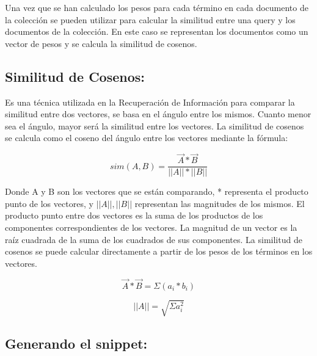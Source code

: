 \documentclass[a4paper,12pt]{article}
\begin{document}
Una vez que se han calculado los pesos para cada término en cada documento de la colección
se pueden utilizar para calcular la similitud entre una query y los documentos de la colección.
En este caso se representan los documentos como un vector de pesos y se calcula la similitud
de cosenos.

\subsection{Similitud de Cosenos:}
Es una técnica utilizada en la Recuperación de Información para comparar la similitud entre dos
vectores, se basa en el ángulo entre los mismos. Cuanto menor sea el ángulo, mayor será la
similitud entre los vectores. La similitud de cosenos se calcula como el coseno del ángulo entre
los vectores mediante la fórmula:
    \begin{center}
    \begin{equation}
        sim(A, B) = \frac{\overrightarrow{A} * \overrightarrow{B}}{||A|| * ||B||} 
    \end{equation}
    \end{center}

Donde A y B son los vectores que se están comparando, * representa el producto punto de los
vectores, y $||A||, ||B||$ representan las magnitudes de los mismos.
El producto punto entre dos vectores es la suma de los productos de los componentes
correspondientes de los vectores. La magnitud de un vector es la raíz cuadrada de la suma de
los cuadrados de sus componentes. La similitud de cosenos se puede calcular directamente a
partir de los pesos de los términos en los vectores.
    
    \begin{center}
    \begin{equation}
        \overrightarrow{A} * \overrightarrow{B} = \Sigma(a_i * b_i)
    \tag*{Producto Vectorial}
    \end{equation}
    \end{center}
    
    \begin{center}
    \begin{equation}
    \tag{Norma de un vector}
        ||A|| = \sqrt{\Sigma a_i^2}
    \end{equation}
    \end{center}

\subsection{Generando el snippet:}
\end{document}
